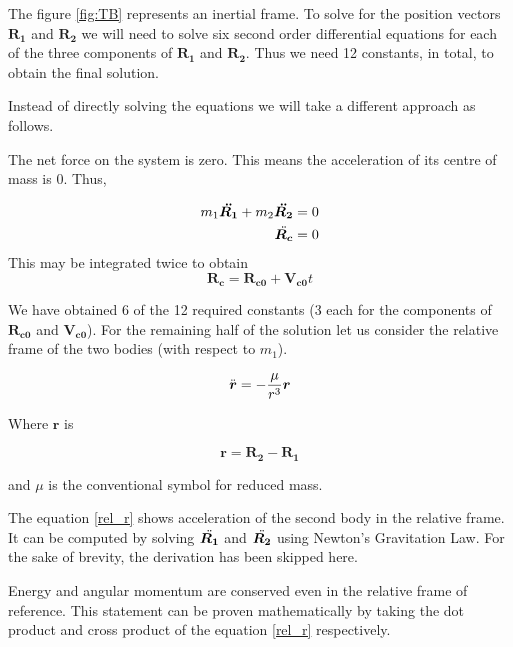 \documentclass{article}
\theoremstyle{definition}
\begin{document}
The figure \ref{fig:TB} represents an inertial frame. To solve for the position vectors $\boldsymbol{R_1}$ and $\boldsymbol{R_2}$ we will need to solve six second order differential equations for each of the three components of $\boldsymbol{R_1}$ and $\boldsymbol{R_2}$.
Thus we need 12 constants, in total, to obtain the final solution. 

Instead of directly solving the equations we will take a different approach as follows. 

The net force on the system is zero. This means the acceleration of its centre of mass is 0. Thus,

\begin{equation}
\begin{split}
    m_1\boldsymbol{\Ddot{R_1}} + m_2\boldsymbol{\Ddot{R_2}} = 0 \\
    \Ddot{\boldsymbol{R_c}}=0
\end{split}
\end{equation}
This may be integrated twice to obtain
\begin{equation}
    \boldsymbol{R_c}= \boldsymbol{R_{c0}} + \boldsymbol{V_{c0}}t
\end{equation}

We have obtained 6 of the 12 required constants (3 each for the components of $\boldsymbol{R_{c0}}$ and $\boldsymbol{V_{c0}}$). 
For the remaining half of the solution let us consider the relative frame of the two bodies (with respect to $m_1$). 

\begin{equation}\label{rel_r}
    \Ddot{\boldsymbol{r}}= -\frac{\mu}{r^3}\boldsymbol{r}
\end{equation}

Where $\boldsymbol{r}$ is

\[\boldsymbol{r}= \boldsymbol{R_2}-\boldsymbol{R_1}\]

and $\mu$ is the conventional symbol for reduced mass.

The equation \ref{rel_r} shows acceleration of the second body in the relative frame. It can be computed by solving $\Ddot{\boldsymbol{R_1}}$ and $\Ddot{\boldsymbol{R_2}}$ using Newton's Gravitation Law. For the sake of brevity, the derivation has been skipped here. \medskip


Energy and angular momentum are conserved even in the relative frame of reference.
This statement can be proven mathematically by taking the dot product and cross product of the equation \ref{rel_r} respectively. 
\end{document}
